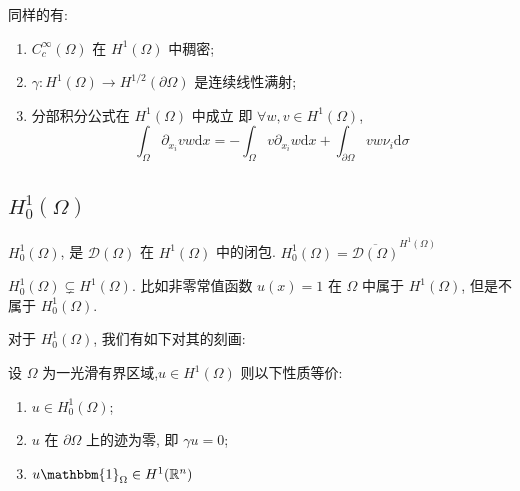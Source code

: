 \documentclass[11pt]{ctexart}[UTF8]
\begin{document}
同样的有: 
\begin{enumerate}
    \item $C_{c}^{\infty}(\Omega)$ 在 $H^{1}(\Omega)$ 中稠密;
    \item $ \gamma: H^{1}(\Omega) \longrightarrow H^{1/2}(\partial \Omega) $ 是连续线性满射;
    \item 分部积分公式在 $H^{1}(\Omega)$ 中成立 即 $\forall w, v \in H^{1}(\Omega)$,
    \begin{equation*}
        \int_{\Omega}\partial_{x_i}v w \mathrm{d}x = -\int_{\Omega} v \partial_{x_i}w \mathrm{d}x + \int_{\partial \Omega} v w \nu_i \mathrm{d}\sigma
    \end{equation*}
\end{enumerate}
\subsection{$H_{0}^{1}(\Omega)$}
\begin{definition}
    $H_{0}^{1}(\Omega) $, 是 $\mathscr{D}(\Omega)$ 在 $H^{1}(\Omega)$ 中的闭包. $H_{0}^{1}(\Omega) = \overline{\mathscr{D}(\Omega)}^{H^{1}(\Omega)}$
\end{definition}
\begin{remark}
    $H_{0}^{1}(\Omega)\subsetneq H^{1}(\Omega)$. 比如非零常值函数 $u(x) = 1$ 在 $\Omega$ 中属于 $H^{1}(\Omega)$, 但是不属于 $H_{0}^{1}(\Omega)$.
\end{remark}
对于 $H_{0}^{1}(\Omega)$, 我们有如下对其的刻画:
\begin{theorem}
    设 $\Omega$ 为一光滑有界区域,$u \in H^{1}(\Omega)$ 则以下性质等价:
    \begin{enumerate}
        \item $u \in H_{0}^{1}(\Omega)$;
        \item $u$ 在 $\partial \Omega$ 上的迹为零, 即 $\gamma u = 0$;
        \item $u \mathbbm{1}_{\Omega} \in H^{1}(\mathbb{R}^n)$
    \end{enumerate}
\end{theorem}
\end{document}
